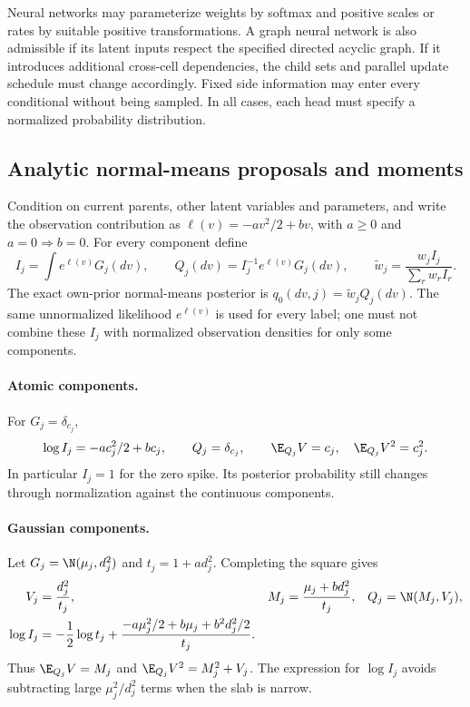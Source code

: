 Neural networks may parameterize weights by softmax and positive scales or
rates by suitable positive transformations. A graph neural network is also
admissible if its latent inputs respect the specified directed acyclic graph.
If it introduces additional cross-cell dependencies, the child sets and
parallel update schedule must change accordingly. Fixed side information
may enter every conditional without being sampled. In all cases, each head
must specify a normalized probability distribution.

\subsection{Analytic normal-means proposals and moments}
\label{sec:familyproposal}
Condition on current parents, other latent variables and parameters, and
write the observation contribution as
\(\ell(v)=-av^2/2+bv\), with \(a\geq0\) and \(a=0\Rightarrow b=0\).
For every component define
\begin{equation}\label{eq:familyI}
I_j=\int e^{\ell(v)}G_j(dv),\qquad
Q_j(dv)=I_j^{-1}e^{\ell(v)}G_j(dv),\qquad
\widetilde w_j=\frac{w_jI_j}{\sum_r w_rI_r}.
\end{equation}
The exact own-prior normal-means posterior is
\(q_0(dv,j)=\widetilde w_jQ_j(dv)\).
The same unnormalized likelihood \(e^{\ell(v)}\) is used for every label;
one must not combine these \(I_j\) with normalized observation densities
for only some components.

\paragraph{Atomic components.}
For \(G_j=\delta_{c_j}\),
\begin{equation}\label{eq:familyatom}
\log I_j=-ac_j^2/2+bc_j,\qquad
Q_j=\delta_{c_j},\qquad
\E_{Q_j}V=c_j,\quad \E_{Q_j}V^2=c_j^2.
\end{equation}
In particular \(I_j=1\) for the zero spike. Its posterior probability still
changes through normalization against the continuous components.

\paragraph{Gaussian components.}
Let \(G_j=\N(\mu_j,d_j^2)\) and \(t_j=1+ad_j^2\). Completing the square gives
\begin{align}
V_j&=\frac{d_j^2}{t_j},&
M_j&=\frac{\mu_j+bd_j^2}{t_j},&
Q_j&=\N(M_j,V_j),\label{eq:familygauss}\\
\log I_j&=-\frac12\log t_j+
\frac{-a\mu_j^2/2+b\mu_j+b^2d_j^2/2}{t_j}.
\label{eq:familygaussI}
\end{align}
Thus \(\E_{Q_j}V=M_j\) and \(\E_{Q_j}V^2=M_j^2+V_j\).
The expression for \(\log I_j\) avoids subtracting large
\(\mu_j^2/d_j^2\) terms when the slab is narrow.

